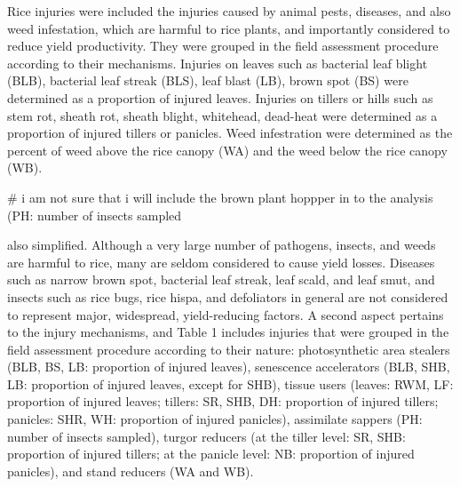 Rice injuries were included the injuries caused by animal pests, diseases, and also weed infestation, which are harmful to rice plants, and importantly considered to reduce yield productivity. They were grouped in the field assessment procedure according to their mechanisms. Injuries on leaves such as bacterial leaf blight (BLB), bacterial leaf streak (BLS), leaf blast (LB), brown spot (BS) were determined as a proportion of injured leaves. Injuries on tillers or hills such as stem rot, sheath rot, sheath blight, whitehead, dead-heat were determined as a proportion of injured tillers  or panicles.  Weed infestration were determined as the percent of weed above the rice canopy (WA) and the weed below the rice canopy (WB). 

# i am not sure that i will include the brown plant hoppper  in to the analysis (PH: number of insects sampled




also simplified. Although a very large number of pathogens, insects, and weeds are harmful to rice, many are seldom considered to cause yield losses. Diseases such as narrow brown spot, bacterial leaf streak, leaf scald, and leaf smut, and insects such as rice bugs, rice hispa, and defoliators in general are not considered to represent major, widespread, yield-reducing factors.  A second aspect pertains to the injury mechanisms, and Table 1 includes injuries that were grouped in the field assessment procedure according to their nature: photosynthetic area stealers (BLB, BS, LB: proportion of injured leaves), senescence accelerators (BLB, SHB, LB: proportion of injured leaves, except for SHB), tissue users (leaves: RWM, LF: proportion of injured leaves; tillers: SR, SHB, DH: proportion of injured tillers; panicles: SHR, WH: proportion of injured panicles), assimilate sappers (PH: number of insects sampled), turgor reducers (at the tiller level: SR, SHB: proportion of injured tillers; at the panicle level: NB: proportion of injured panicles), and stand reducers (WA and WB).
